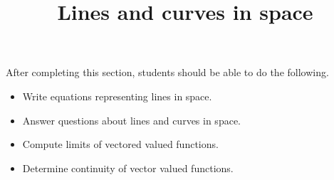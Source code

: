 \documentclass{ximera}
\title{Lines and curves in space}
\begin{document}
\begin{abstract}
\end{abstract}

\maketitle

\begin{sectionOutcomes}

After completing this section, students should be able to do the following.

\begin{itemize}
\item Write equations representing lines in space. 
\item Answer questions about lines and curves in space.
\item Compute limits of vectored valued functions.
\item Determine continuity of vector valued functions. 
\end{itemize}

\end{sectionOutcomes}
\end{document}
